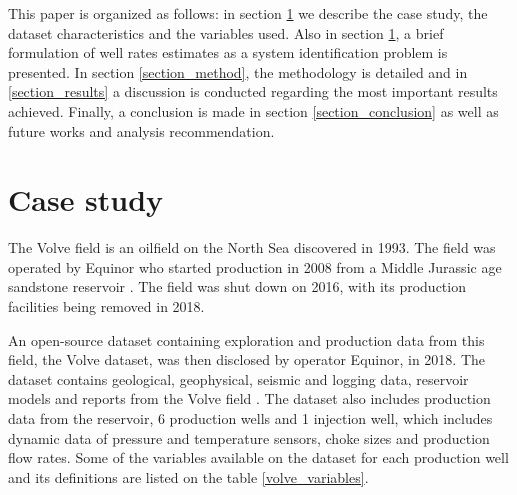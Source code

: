\documentclass[conference]{IEEEtran}
\begin{document}

This paper is organized as follows: in section \ref{section_case_study} we describe the case 
study, the dataset characteristics and the variables used. Also in section 
\ref{section_case_study}, a brief formulation of well rates estimates as a system 
identification problem is presented. In section \ref{section_method}, the methodology is 
detailed and in \ref{section_results} a discussion is conducted regarding the most important 
results achieved. Finally, a conclusion is made in section \ref{section_conclusion} as well as 
future works and analysis recommendation.


\section{Case study}\label{section_case_study}

The Volve field is an oilfield on the North Sea discovered in 1993. The field was operated by 
Equinor who started production in 2008 from a Middle Jurassic age sandstone reservoir 
\cite{volve_info}. The field was shut down on 2016, with its production facilities being 
removed in 2018.

An open-source dataset containing exploration and production data from this field, the Volve 
dataset, was then disclosed by operator Equinor, in 2018. The dataset contains geological, 
geophysical, seismic and logging data, reservoir models and reports from the Volve field 
\cite{volve_data}. The dataset also includes production data from the reservoir, 6 production 
wells and 1 injection well, which includes dynamic data of pressure and temperature sensors, 
choke sizes and production flow rates. Some of the variables available on the dataset for each 
production well and its definitions are listed on the table \ref{volve_variables}.
\end{document}
